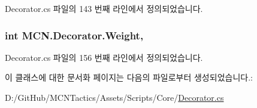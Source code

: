 Decorator.\+cs 파일의 143 번째 라인에서 정의되었습니다.

\subsubsection[{\texorpdfstring{Weight}{Weight}}]{\setlength{\rightskip}{0pt plus 5cm}int M\+C\+N.\+Decorator.\+Weight\hspace{0.3cm}{\ttfamily [get]}, {\ttfamily [set]}}\hypertarget{class_m_c_n_1_1_decorator_a6f6dcca5e0dfb225bcfe2fa73c0ef752}{}\label{class_m_c_n_1_1_decorator_a6f6dcca5e0dfb225bcfe2fa73c0ef752}


Decorator.\+cs 파일의 156 번째 라인에서 정의되었습니다.



이 클래스에 대한 문서화 페이지는 다음의 파일로부터 생성되었습니다.\+:\begin{DoxyCompactItemize}
\item 
D\+:/\+Git\+Hub/\+M\+C\+N\+Tactics/\+Assets/\+Scripts/\+Core/\hyperlink{_decorator_8cs}{Decorator.\+cs}\end{DoxyCompactItemize}

